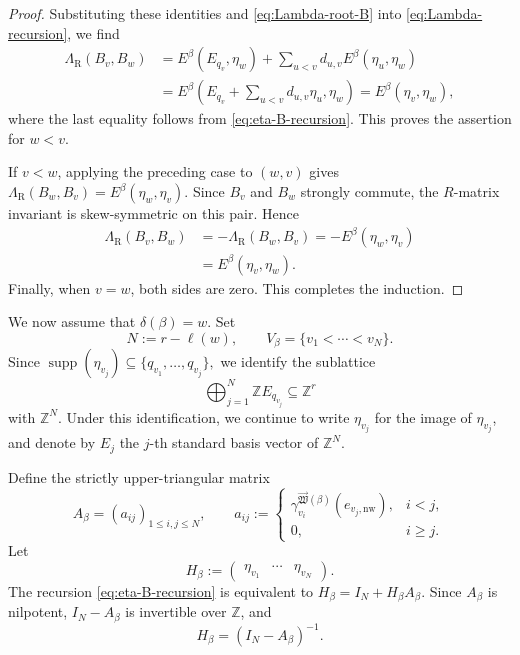 \documentclass[12pt, reqno]{amsart}
\theoremstyle{plain}
\theoremstyle{definition}
\numberwithin{equation}{section}
\newcommand{\ZZ}{\mathbb{Z}}
\newcommand{\LambdaR}{\Lambda_{\mathrm R}}
\begin{document}
\begin{proof}
Substituting these identities and \eqref{eq:Lambda-root-B} into
\eqref{eq:Lambda-recursion}, we find
\begin{align*}
    \LambdaR(B_v,B_w)
    &=
    E^\beta(E_{q_v},\eta_w)
    +
    \sum_{u<v}d_{u,v}E^\beta(\eta_u,\eta_w)\\
    &=
    E^\beta\left(
        E_{q_v}
        +
        \sum_{u<v}d_{u,v}\eta_u,
        \eta_w
    \right)
    =
    E^\beta(\eta_v,\eta_w),
\end{align*}
where the last equality follows from
\eqref{eq:eta-B-recursion}. This proves the assertion for \(w<v\).

If \(v<w\), applying the preceding case to \((w,v)\) gives
\(\LambdaR(B_w,B_v)=E^\beta(\eta_w,\eta_v)\). Since \(B_v\) and \(B_w\)
strongly commute, the \(R\)-matrix invariant is skew-symmetric on this
pair. Hence
\begin{align*}
    \LambdaR(B_v,B_w)
    &=
    -\LambdaR(B_w,B_v)
    =
    -E^\beta(\eta_w,\eta_v)\\
    &=
    E^\beta(\eta_v,\eta_w).
\end{align*}
Finally, when \(v=w\), both sides are zero. This completes the
induction.
\end{proof}

We now assume that \(\delta(\beta)=w\). Set
\begin{equation*}
    N:=r-\ell(w),
    \qquad
    V_\beta=\{v_1<\cdots<v_N\}.
\end{equation*}
Since
\(
    \operatorname{supp}(\eta_{v_j})
    \subseteq
    \{q_{v_1},\ldots,q_{v_j}\},
\)
we identify the sublattice
\begin{equation*}
    \bigoplus_{j=1}^N\ZZ E_{q_{v_j}}
    \subseteq\ZZ^r
\end{equation*}
with \(\ZZ^N\). Under this identification, we continue to write
\(\eta_{v_j}\) for the image of \(\eta_{v_j}\), and denote by \(E_j\)
the \(j\)-th standard basis vector of \(\ZZ^N\).

Define the strictly upper-triangular matrix
\begin{equation*}
    A_\beta
    =
    (a_{ij})_{1\leq i,j\leq N},
    \qquad
    a_{ij}
    :=
    \begin{cases}
        \gamma_{v_i}^{\overrightarrow{\mathfrak W}(\beta)}
        (e_{v_j,\mathrm{nw}}),
            & i<j,\\
        0,
            & i\geq j.
    \end{cases}
\end{equation*}
Let
\begin{equation*}    H_\beta
    :=
    \begin{pmatrix}
        \eta_{v_1}&\cdots&\eta_{v_N}
    \end{pmatrix}.
\end{equation*}
The recursion \eqref{eq:eta-B-recursion} is equivalent to
\( H_\beta=I_N+H_\beta A_\beta.
\)
Since \(A_\beta\) is nilpotent, \(I_N-A_\beta\) is
invertible over \(\ZZ\), and
\begin{equation}\label{eq:H-beta-inverse}
    H_\beta=(I_N-A_\beta)^{-1}.
\end{equation}
\end{document}

